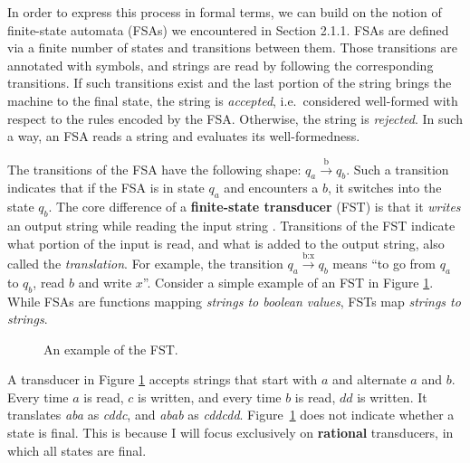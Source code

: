 In order to express this process in formal terms, we can build on the notion of finite-state automata (FSAs) we encountered in Section 2.1.1.
FSAs are defined via a finite number of states and transitions between them.
Those transitions are annotated with symbols, and strings are read by following the corresponding transitions.
If such transitions exist and the last portion of the string brings the machine to the final state, the string is \emph{accepted}, i.e.\ considered well-formed with respect to the rules encoded by the FSA.
Otherwise, the string is \emph{rejected}.
In such a way, an FSA reads a string and evaluates its well-formedness.

The transitions of the FSA have the following shape: $q_{a}\xrightarrow{\text{b}}q_{b}$.
Such a transition indicates that if the FSA is in state $q_a$ and encounters a $b$, it switches into the state $q_b$.
The core difference of a \textbf{finite-state transducer} (FST) is that it \emph{writes} an output string while reading the input string \citep{Schuetzenberger1961}.
Transitions of the FST indicate what portion of the input is read, and what is added to the output string, also called the \emph{translation}.
For example, the transition $q_{a}\xrightarrow{\text{b:x}}q_{b}$ means ``to go from $q_{a}$ to $q_{b}$, read $b$ and write $x$''.
Consider a simple example of an FST in Figure \ref{fig:transabcd}.
While FSAs are functions mapping \emph{strings to boolean values}, FSTs map \emph{strings to strings}.


\begin{figure}[h!] 
\centering
{}
\caption{An example of the FST.}
\label{fig:transabcd}
\end{figure}

A transducer in Figure \ref{fig:transabcd} accepts strings that start with $a$ and alternate $a$ and $b$.
Every time $a$ is read, $c$ is written, and every time $b$ is read, $dd$ is written.
It translates \emph{aba} as \emph{cddc}, and \emph{abab} as \emph{cddcdd}.
Figure~\ref{fig:transabcd} does not indicate whether a state is final.
This is because I will focus exclusively on \textbf{rational} transducers, in which all states are final.


